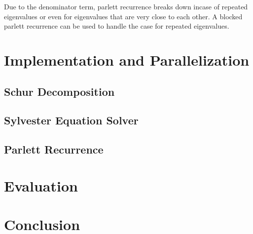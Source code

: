 \documentclass{article}
\begin{document}
Due to the denominator term, parlett recurrence breaks down incase of repeated eigenvalues or even for eigenvalues that are very close to each other. A blocked parlett recurrence can be used to handle the case for repeated eigenvalues.

\section{Implementation and Parallelization}

\subsection{Schur Decomposition}




\subsection{Sylvester Equation Solver}



\subsection{Parlett Recurrence}

\section{Evaluation}

\section{Conclusion}
\end{document}
